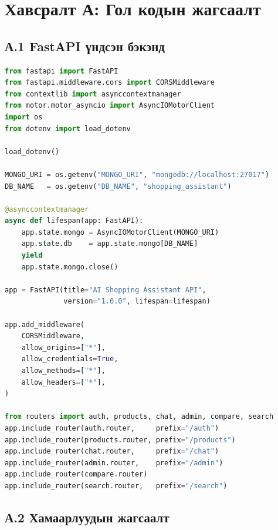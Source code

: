 \documentclass[12pt,a4paper]{report}
\begin{document}
\clearpage
\appendix
\chapter*{Хавсралт А: Гол кодын жагсаалт}

\section*{А.1 FastAPI үндсэн бэкэнд}

\begin{lstlisting}[language=Python, caption={main.py --- FastAPI серверийн үндэс}, label={lst:main}]
from fastapi import FastAPI
from fastapi.middleware.cors import CORSMiddleware
from contextlib import asynccontextmanager
from motor.motor_asyncio import AsyncIOMotorClient
import os
from dotenv import load_dotenv

load_dotenv()

MONGO_URI = os.getenv("MONGO_URI", "mongodb://localhost:27017")
DB_NAME   = os.getenv("DB_NAME", "shopping_assistant")

@asynccontextmanager
async def lifespan(app: FastAPI):
    app.state.mongo = AsyncIOMotorClient(MONGO_URI)
    app.state.db    = app.state.mongo[DB_NAME]
    yield
    app.state.mongo.close()

app = FastAPI(title="AI Shopping Assistant API",
              version="1.0.0", lifespan=lifespan)

app.add_middleware(
    CORSMiddleware,
    allow_origins=["*"],
    allow_credentials=True,
    allow_methods=["*"],
    allow_headers=["*"],
)

from routers import auth, products, chat, admin, compare, search
app.include_router(auth.router,     prefix="/auth")
app.include_router(products.router, prefix="/products")
app.include_router(chat.router,     prefix="/chat")
app.include_router(admin.router,    prefix="/admin")
app.include_router(compare.router)
app.include_router(search.router,   prefix="/search")
\end{lstlisting}

\section*{А.2 Хамаарлуудын жагсаалт}
\end{document}
